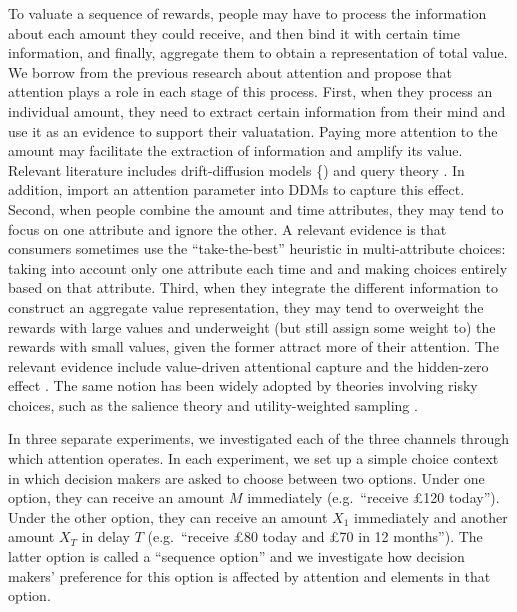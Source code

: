 \documentclass[
  12pt,
]{article}
\begin{document}
To valuate a sequence of rewards, people may have to process the
information about each amount they could receive, and then bind it with
certain time information, and finally, aggregate them to obtain a
representation of total value. We borrow from the previous research
about attention and propose that attention plays a role in each stage of
this process. First, when they process an individual amount, they need
to extract certain information from their mind and use it as an evidence
to support their valuatation. Paying more attention to the amount may
facilitate the extraction of information and amplify its value. Relevant
literature includes drift-diffusion models
\{\citep[DDMs, see][]{ratcliff2016diffusion}) and query theory
\citep{weber2007asymmetric, johnson2007aspects}. In addition,
\citet{krajbich2010visual} import an attention parameter into DDMs to
capture this effect. Second, when people combine the amount and time
attributes, they may tend to focus on one attribute and ignore the
other. A relevant evidence is that consumers sometimes use the
``take-the-best'' heuristic \citep{gigerenzer2011heuristic} in
multi-attribute choices: taking into account only one attribute each
time and and making choices entirely based on that attribute. Third,
when they integrate the different information to construct an aggregate
value representation, they may tend to overweight the rewards with large
values and underweight (but still assign some weight to) the rewards
with small values, given the former attract more of their attention. The
relevant evidence include value-driven attentional
capture\citep{hickey2010reward, anderson2011value, chelazzi2013rewards}
and the hidden-zero effect
\citep{magen2008hidden, radu2011mechanism, read2017value}. The same
notion has been widely adopted by theories involving risky choices, such
as the salience theory \citep{bordalo2012salience, bordalo2013salience}
and utility-weighted sampling \citep{lieder2018overrepresentation}.

In three separate experiments, we investigated each of the three
channels through which attention operates. In each experiment, we set up
a simple choice context in which decision makers are asked to choose
between two options. Under one option, they can receive an amount \(M\)
immediately (e.g.~``receive £120 today''). Under the other option, they
can receive an amount \(X_1\) immediately and another amount \(X_T\) in
delay \(T\) (e.g.~``receive £80 today and £70 in 12 months''). The
latter option is called a ``sequence option'' and we investigate how
decision makers' preference for this option is affected by attention and
elements in that option.
\end{document}
